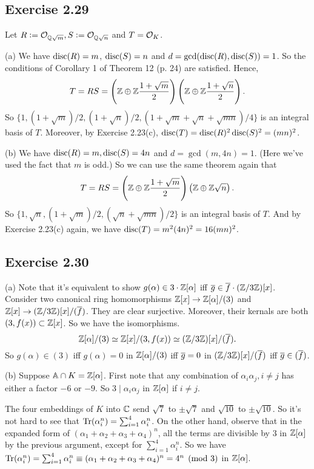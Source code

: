 \documentclass[../Marcus.tex]{subfiles}
\begin{document}
\subsection*{Exercise 2.29}

Let $R:=\mathcal{O}_{\mathbb{Q}\sqrt{m}},S:=\mathcal{O}_{\mathbb{Q}\sqrt{n}}$ and $T=\mathcal{O}_K$. 

(a) We have $\operatorname{disc}(R)=m$, $\operatorname{disc}(S)=n$ and $d=\gcd(\operatorname{disc}(R),\operatorname{disc}(S))=1$. So the conditions of Corollary 1 of Theorem 12 (p. 24) are satisfied. Hence, 
$$
T=RS=\left(\mathbb{Z}\oplus\mathbb{Z}\frac{1+\sqrt{m}}{2}\right)\left(\mathbb{Z}\oplus\mathbb{Z}\frac{1+\sqrt{n}}{2}\right).
$$ 
So $\{1,(1+\sqrt{m})/2,(1+\sqrt{n})/2,(1+\sqrt{m}+\sqrt{n}+\sqrt{mn})/4\}$ is an integral basis of $T$. Moreover, by Exercise 2.23(c), $\operatorname{disc}(T)=\operatorname{disc}(R)^2\operatorname{disc}(S)^2=(mn)^2$.  

(b) We have $\operatorname{disc}(R)=m,\operatorname{disc}(S)=4n$ and $d=\gcd(m,4n)=1$. (Here we've used the fact that $m$ is odd.) So we can use the same theorem again that
$$
T=RS=\left(\mathbb{Z}\oplus\mathbb{Z}\frac{1+\sqrt{m}}{2}\right)\left(\mathbb{Z}\oplus\mathbb{Z}\sqrt{n}\right).
$$ 
So $\{1,\sqrt{n},(1+\sqrt{m})/2,(\sqrt{n}+\sqrt{mn})/2\}$ is an integral basis of $T$. And by Exercise 2.23(c) again, we have $\operatorname{disc}(T)=m^2(4n)^2=16(mn)^2$.

\subsection*{Exercise 2.30}

(a) Note that it's equivalent to show $g(\alpha)\in3\cdot\mathbb{Z}[\alpha]$ iff $\overline{g}\in\overline{f}\cdot(\mathbb{Z}/3\mathbb{Z})[x]$. Consider two canonical ring homomorphisms $\mathbb{Z}[x]\to\mathbb{Z}[\alpha]/(3)$ and $\mathbb{Z}[x]\to(\mathbb{Z}/3\mathbb{Z})[x]/(\overline{f})$. They are clear surjective. Moreover, their kernals are both $(3,f(x))\subset\mathbb{Z}[x]$. So we have the isomorphisms. 
$$
\mathbb{Z}[\alpha]/(3) \simeq \mathbb{Z}[x]/(3,f(x)) \simeq (\mathbb{Z}/3\mathbb{Z})[x]/(\overline{f}).
$$ 
So $g(\alpha)\in(3)$ iff $g(\alpha)=0$ in $\mathbb{Z}[\alpha]/(3)$ iff $\overline{g}=0$ in $(\mathbb{Z}/3\mathbb{Z})[x]/(\overline{f})$ iff $\overline{g}\in(\overline{f})$.

(b) Suppose $\mathbb{A}\cap K=\mathbb{Z}[\alpha]$. First note that any combination of $\alpha_i\alpha_j,i\neq j$ has either a factor $-6$ or $-9$. So $3\mid\alpha_i\alpha_j$ in $\mathbb{Z}[\alpha]$ if $i\neq j$.

The four embeddings of $K$ into $\mathbb{C}$ send $\sqrt{7}$ to $\pm\sqrt{7}$ and $\sqrt{10}$ to $\pm\sqrt{10}$. So it's not hard to see that $\operatorname{Tr}(\alpha_i^n)=\sum_{i=1}^4 \alpha_i^n$. On the other hand, observe that in the expanded form of $(\alpha_1+\alpha_2+\alpha_3+\alpha_4)^n$, all the terms are divisible by $3$ in $\mathbb{Z}[\alpha]$ by the previous argument, except for $\sum_{i=1}^4 \alpha_i^n$. So we have $\operatorname{Tr}(\alpha_i^n)=\sum_{i=1}^4 \alpha_i^n \equiv (\alpha_1+\alpha_2+\alpha_3+\alpha_4)^n =4^n \pmod{3}$ in $\mathbb{Z}[\alpha]$.
\end{document}
